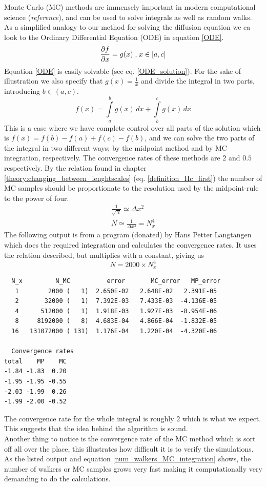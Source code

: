 Monte Carlo (MC) methods are immensely important in modern computational science (\emph{reference}), and can be used to solve integrals as well as random walks. 
As a simplified analogy to our method for solving the diffusion equation we ca look to the Ordinary Differential Equation (ODE) in equation \eqref{ODE}. 
\begin{equation}\label{ODE}
 \frac{\partial f}{\partial x} = g(x)\;\text{,}\; x\in [a,c]
\end{equation}
Equation \eqref{ODE} is easily solvable (see eq. \eqref{ODE_solution}). For the sake of illustration we also specify that $g(x) = \frac{1}{x}$ and divide the integral in two parts, introducing $b\in (a,c)$.
\begin{equation}\label{ODE_solution}
 f(x) = \int\limits_a^b g(x)\,dx + \int\limits_b^c g(x)\,dx
\end{equation}
This is a case where we have complete control over all parts of the solution which is $f(x) = f(b)-f(a) + f(c)-f(b)$, and we can solve the two parts of the integral in two different ways; by the midpoint method and by MC integration, respectively. The convergence rates of these methods are $2$ and $0.5$ respectively. 
By the relation found in chapter \ref{theory:changing_between_lenghtscales} (eq. \eqref{definition_Hc_first}) the number of MC samples should be proportionate to the resolution used by the midpoint-rule to the power of four. 
\begin{align*}
 \frac{1}{\sqrt{N}} \simeq \Delta x^2 \\
 N \simeq \frac{1}{\Delta x^4} = N_x^4
\end{align*}
The following output is from a program (donated) by Hans Petter Langtangen which does the required integration and calculates the convergence rates. 
It uses the relation described, but multiplies with a constant, giving us 
\begin{equation}\label{num_walkers_MC_integration}
 N = 2000\times N_x^4
\end{equation}
\clearpage
\begin{lstlisting}
  N_x	      N_MC	        error       MC_error   MP_error
   1        2000 (   1)  2.650E-02   2.648E-02   2.391E-05
   2       32000 (   1)  7.392E-03   7.433E-03  -4.136E-05
   4      512000 (   1)  1.918E-03   1.927E-03  -8.954E-06
   8     8192000 (   8)  4.683E-04   4.866E-04  -1.832E-05
  16   131072000 ( 131)  1.176E-04   1.220E-04  -4.320E-06
  
  Convergence rates
total    MP    MC
-1.84 -1.83  0.20
-1.95 -1.95 -0.55
-2.03 -1.99  0.26
-1.99 -2.00 -0.52
\end{lstlisting}
The convergence rate for the whole integral is roughly $2$ which is what we expect. This suggests that the idea behind the algorithm is sound. \\
Another thing to notice is the convergence rate of the MC method which is sort off all over the place, this illustrates how difficult it is to verify the simulations. 
As the listed output and equation \eqref{num_walkers_MC_integration} shows, the number of walkers or MC samples grows very fast making it computationally very demanding to do the calculations.

